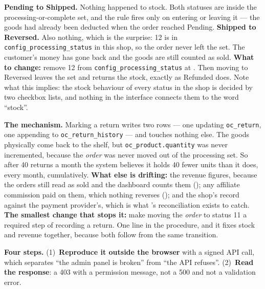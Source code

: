 \begin{ans}
  \item \textbf{Pending to Shipped.} Nothing happened to stock. Both statuses
        are inside the processing-or-complete set, and the rule fires only on
        entering or leaving it --- the goods had already been deducted when the
        order reached Pending. \textbf{Shipped to Reversed.} Also nothing,
        which is the surprise: 12 is in \texttt{config\_processing\_status} in
        this shop, so the order never left the set. The customer's money has
        gone back and the goods are still counted as sold. \textbf{What to
        change:} remove 12 from \texttt{config\_processing\_status} at
        . Then moving to Reversed
        leaves the set and returns the stock, exactly as Refunded does. Note
        what this implies: the stock behaviour of every status in the shop is
        decided by two checkbox lists, and nothing in the interface connects
        them to the word ``stock''.
  \item \textbf{The mechanism.} Marking a return  writes two
        rows --- one updating \texttt{oc\_return}, one appending to
        \texttt{oc\_return\_history} --- and touches nothing else. The goods
        physically come back to the shelf, but \texttt{oc\_product.quantity} was
        never incremented, because the \emph{order} was never moved out of the
        processing set. So after 40 returns a month the system believes it holds
        40 fewer units than it does, every month, cumulatively.
        \textbf{What else is drifting:} the revenue figures, because the orders
        still read as sold and the dashboard counts them ();
        any affiliate commission paid on them, which nothing reverses
        (); and the shop's record against the payment
        provider's, which is what 's reconciliation exists to
        catch. \textbf{The smallest change that stops it:} make moving the
        \emph{order} to status 11 a required step of recording a return. One
        line in the procedure, and it fixes stock and revenue together, because
        both follow from the same transition.
  \item \textbf{Four steps.} (1)~\textbf{Reproduce it outside the browser} with
        a signed API call, which separates ``the admin panel is broken'' from
        ``the API refuses''. (2)~\textbf{Read the response}: a 403 with a
        permission message, not a 500 and not a validation error.

\end{ans}
